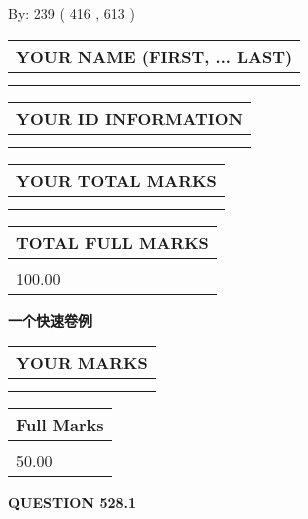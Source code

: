 \documentclass{ctexart}
\begin{document}
   
\hspace{1.0in} By: 
 239 ( 416 ,  613 )
   
   
   
   
\newpage 
\setcounter{page}{ 
   528001 } 
   
   
   
   
\noindent\begin{tabular}{|l|}
\hline
YOUR NAME (FIRST, ... LAST)  \\
\hline
 \\ 
 \\ 
\hline
\end{tabular}
\hspace{0.05in} \begin{tabular}{|l|}
\hline
 YOUR   ID   INFORMATION  \\
\hline
 \\ 
 \\ 
\hline
\end{tabular}
   
   
\vspace{0.2in}\noindent\begin{tabular}{|l|}
\hline
YOUR TOTAL MARKS  \\
\hline
 \\ 
 \\ 
\hline
\end{tabular}
\hspace{0.05in} \begin{tabular}{|l|}
\hline
TOTAL FULL MARKS  \\
\hline
 \\ 
100.00 \\
\hline
\end{tabular}
   
   
 \vspace{0.2in}
{\LARGE {\textbf{ 一个快速卷例}}}
   
   
  
\vspace{0.2in}
  
\noindent\begin{tabular}{|l|}
\hline
 YOUR MARKS  \\
\hline
 \\ 
 \\ 
\hline
\end{tabular}
\hspace{0.05in} \begin{tabular}{|l|}
\hline
 Full Marks  \\
\hline
 \\ 
50.00 \\
\hline
\end{tabular}
{\textbf{\Large{QUESTION
528.1 
}}}
  
\end{document}
